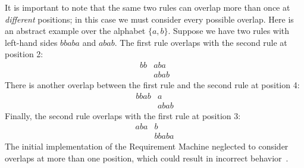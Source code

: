 \documentclass[../generics]{subfiles}
\begin{document}
\begin{example}
It is important to note that the same two rules can overlap more than once at \emph{different} positions; in this case we must consider every possible overlap. Here is an abstract example over the alphabet $\{a, b\}$. Suppose we have two rules with left-hand sides $bbaba$ and $abab$. The first rule overlaps with the second rule at position 2:
\begin{align*}
bb&aba\\
  &abab
\end{align*}
There is another overlap between the first rule and the second rule at position 4:
\begin{align*}
bbab&a\\
    &abab
\end{align*}
Finally, the second rule overlaps with the first rule at position 3:
\begin{align*}
aba&b\\
   &bbaba
\end{align*}
The initial implementation of the Requirement Machine neglected to consider overlaps at more than one position, which could result in incorrect behavior~\cite{rqmoverlapbug}.
\end{example}
\end{document}

